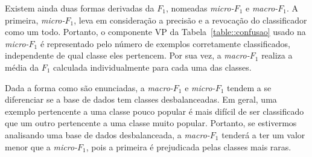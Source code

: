 Existem ainda duas formas derivadas da $F_1$, nomeadas \textit{micro-$F_1$} e \textit{macro-$F_1$}. A primeira, \textit{micro-$F_1$}, leva em consideração a precisão e a revocação do classificador como um todo.
Portanto, o componente VP da Tabela~\ref{table::confusao} usado na \textit{micro-$F_1$} é representado pelo número de exemplos corretamente classificados, independente de qual classe eles pertencem.
Por sua vez, a \textit{macro-$F_1$} realiza a média da $F_1$ calculada individualmente para cada uma das classes.

Dada a forma como são enunciadas, a \textit{macro-$F_1$} e \textit{micro-$F_1$} tendem a se diferenciar se a base de dados tem classes desbalanceadas. Em geral, uma exemplo pertencente a uma classe pouco popular é mais difícil de ser classificado que um outro pertencente a uma classe muito popular. Portanto, se estivermos analisando uma base de dados desbalanceada, a \textit{macro-$F_1$} tenderá a ter um valor menor que a \textit{micro-$F_1$}, pois a primeira é prejudicada pelas classes mais raras.


